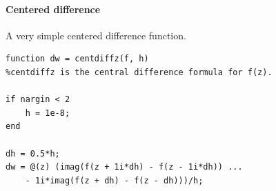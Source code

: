 \documentclass[12pt,fleqn]{article}
\begin{document}
\paragraph{Centered difference}
A very simple centered difference function.
\begin{lstlisting}
function dw = centdiffz(f, h)
%centdiffz is the central difference formula for f(z).

if nargin < 2
    h = 1e-8;
end

dh = 0.5*h;
dw = @(z) (imag(f(z + 1i*dh) - f(z - 1i*dh)) ...
    - 1i*imag(f(z + dh) - f(z - dh)))/h;
\end{lstlisting}
\end{document}
